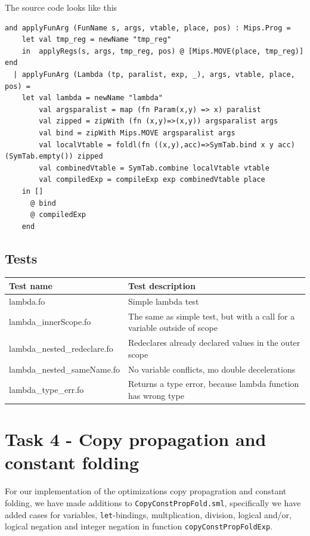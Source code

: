 \documentclass[11pt]{article}
\begin{document}
The source code looks like this
 \begin{lstlisting}[firstnumber=850]
and applyFunArg (FunName s, args, vtable, place, pos) : Mips.Prog =
    let val tmp_reg = newName "tmp_reg"
    in  applyRegs(s, args, tmp_reg, pos) @ [Mips.MOVE(place, tmp_reg)] end
  | applyFunArg (Lambda (tp, paralist, exp, _), args, vtable, place, pos) =
    let val lambda = newName "lambda"
        val argsparalist = map (fn Param(x,y) => x) paralist
        val zipped = zipWith (fn (x,y)=>(x,y)) argsparalist args 
        val bind = zipWith Mips.MOVE argsparalist args
        val localVtable = foldl(fn ((x,y),acc)=>SymTab.bind x y acc) (SymTab.empty()) zipped
        val combinedVtable = SymTab.combine localVtable vtable
        val compiledExp = compileExp exp combinedVtable place
    in []
      @ bind
      @ compiledExp
    end
\end{lstlisting}


\subsection{Tests}


    \begin{tabular}{|l|l|}
        \hline
        \textbf{Test name} & \textbf{Test description}                        \\
        \hline
        lambda.fo           & Simple lambda test    \\
        \hline
        lambda\_innerScope.fo        & The same as simple test, but with a call for a variable outside of scope     \\
        \hline
        lambda\_nested\_redeclare.fo   & Redeclares already declared values in the outer scope                           \\
        \hline
        lambda\_nested\_sameName.fo        & No variable conflicts, mo double decelerations       \\
        \hline
        lambda\_type\_err.fo     & Returns a type error, because lambda function has wrong type  \\
       
        \hline
    \end{tabular}








    \section{Task 4 - Copy propagation and constant folding}
	For our implementation of the optimizations copy propagration and constant
	folding, we have made additions to \texttt{CopyConstPropFold.sml}, specifically
	we have added cases for variables, \texttt{let}-bindings, multplication,
	division, logical and/or, logical negation and integer negation in function
	\texttt{copyConstPropFoldExp}.
\end{document}
